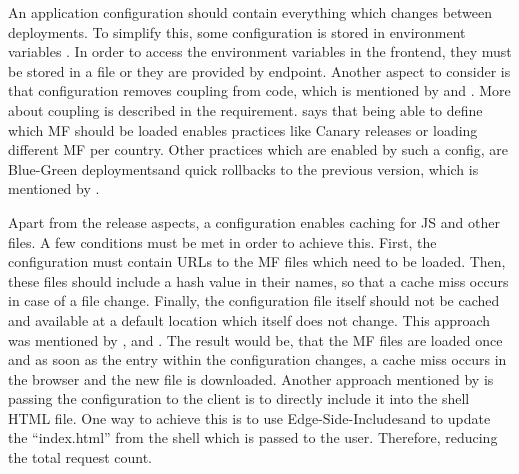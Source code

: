 An application configuration should contain everything which changes between deployments.
To simplify this, some configuration is stored in environment variables \cite{Wiggins.2017}.
In order to access the environment variables in the frontend, they must be stored in a file or they are provided by endpoint.
Another aspect to consider is that configuration removes coupling from code, which is mentioned by \textcite{Dornenburg.2019} and \textciteMezzalira{}.
More about coupling is described in the \textit{} requirement.
\citeauthorMezzalira{} says that being able to define which \ac{MF} should be loaded enables practices like Canary releases\footnotemark{} or loading different \ac{MF} per country.
Other practices which are enabled by such a config, are Blue-Green deployments\footnotemark and quick rollbacks to the previous version, which is mentioned by \textciteRehm{}.

Apart from the release aspects, a configuration enables caching for \ac{JS} and other files.
A few conditions must be met in order to achieve this.
First, the configuration must contain \acp{URL} to the \ac{MF} files which need to be loaded.
Then, these files should include a hash value in their names, so that a cache miss occurs in case of a file change.
Finally, the configuration file itself should not be cached and available at a default location which itself does not change.
This approach was mentioned by \textciteOlleck{}, \textcite{Leitner.2020} and \textcite{Dornenburg.2019}.
The result would be, that the \ac{MF} files are loaded once and as soon as the entry within the configuration changes, a cache miss occurs in the browser and the new file is downloaded.
Another approach mentioned by \citeauthor{Leitner.2020} is passing the configuration to the client is to directly include it into the shell \ac{HTML} file.
One way to achieve this is to use Edge-Side-Includes\footnotemark and to update the \enquote{index.html} from the shell which is passed to the user.
Therefore, reducing the total request count.


